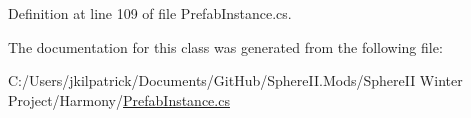Definition at line 109 of file Prefab\+Instance.\+cs.



The documentation for this class was generated from the following file\+:\begin{DoxyCompactItemize}
\item 
C\+:/\+Users/jkilpatrick/\+Documents/\+Git\+Hub/\+Sphere\+I\+I.\+Mods/\+Sphere\+I\+I Winter Project/\+Harmony/\mbox{\hyperlink{_prefab_instance_8cs}{Prefab\+Instance.\+cs}}\end{DoxyCompactItemize}
